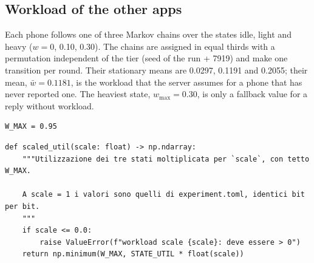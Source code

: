 \documentclass[11pt,a4paper]{article}
\begin{document}
\subsection{Workload of the other apps}

Each phone follows one of three Markov chains over the states idle, light and
heavy ($w = 0$, 0.10, 0.30). The chains are assigned in equal thirds with a
permutation independent of the tier (seed of the run + 7919) and make one
transition per round. Their stationary means are 0.0297, 0.1191 and 0.2055;
their mean, $\bar{w} = 0.1181$, is the workload that the server assumes for a
phone that has never reported one. The heaviest state, $w_{\max} = 0.30$, is
only a fallback value for a reply without workload.

\begin{lstlisting}[style=py,firstnumber=41,caption={\texttt{tesifl/device/workload.py}, lines 41--41}]
W_MAX = 0.95
\end{lstlisting}

\begin{lstlisting}[style=py,firstnumber=44,caption={\texttt{tesifl/device/workload.py}, lines 44--51}]
def scaled_util(scale: float) -> np.ndarray:
    """Utilizzazione dei tre stati moltiplicata per `scale`, con tetto W_MAX.

    A scale = 1 i valori sono quelli di experiment.toml, identici bit per bit.
    """
    if scale <= 0.0:
        raise ValueError(f"workload scale {scale}: deve essere > 0")
    return np.minimum(W_MAX, STATE_UTIL * float(scale))
\end{lstlisting}
\end{document}

